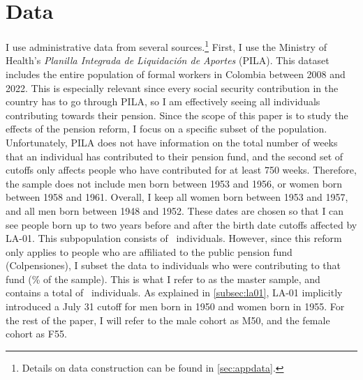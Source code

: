 \documentclass[12pt, a4paper]{article}
\begin{document}
\section{Data \label{sec:data}}

I use administrative data from several sources.\footnote{Details on data construction can be found in \autoref{sec:appdata}.} First, I use the Ministry of Health's \textit{Planilla Integrada de Liquidación de Aportes} (PILA). This dataset includes the entire population of formal workers in Colombia between 2008 and 2022. This is especially relevant since every social security contribution in the country has to go through PILA, so I am effectively seeing all individuals contributing towards their pension. Since the scope of this paper is to study the effects of the pension reform, I focus on a specific subset of the population. Unfortunately, PILA does not have information on the total number of weeks that an individual has contributed to their pension fund, and the second set of cutoffs only affects people who have contributed for at least 750 weeks. Therefore, the sample does not include men born between 1953 and 1956, or women born between 1958 and 1961. Overall, I keep all women born between 1953 and 1957, and all men born between 1948 and 1952. These dates are chosen so that I can see people born up to two years before and after the birth date cutoffs affected by LA-01.  This subpopulation consists of \totalN\ individuals. However, since this reform only applies to people who are affiliated to the public pension fund (Colpensiones), I subset the data to individuals who were contributing to that fund (\colpensiones\% of the sample). This is what I refer to as the master sample, and contains a total of \masterN\ individuals. As explained in \autoref{subsec:la01}, LA-01 implicitly introduced a July 31 cutoff for men born in 1950 and women born in 1955. For the rest of the paper, I will refer to the male cohort as M50, and the female cohort as F55.
\end{document}
